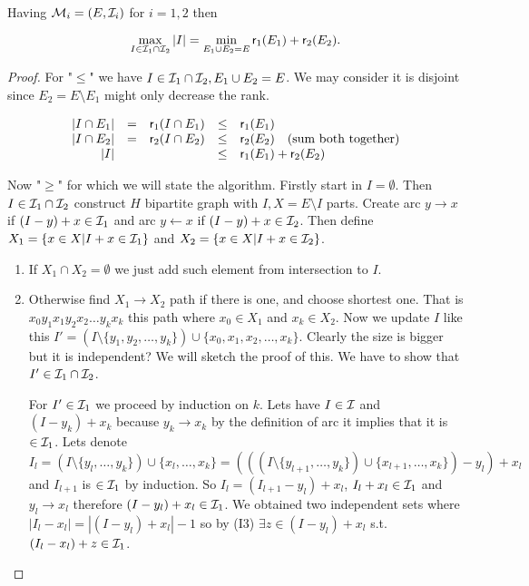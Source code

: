 \begin{thm}
	Having $\mathcal{M}_i = (E, \mathcal{I}_i)$ for $i = 1,2$ then
	
	$$
	\max_{I \in \mathcal{I}_1 \cap \mathcal{I}_2} |I| = \min_{E_1 \cup E_2 = E} \operatorname{\textsf{r}}_1(E_1) + \operatorname{\textsf{r}}_2(E_2).
	$$
	\label{min-max-thm}
\end{thm}

\begin{proof}
	For "$\leq$" we have $I \in \mathcal{I}_1 \cap \mathcal{I}_2, E_1 \cup E_2 = E$. We may consider it is disjoint since $E_2 = E \setminus E_1$ might only decrease the rank.
	
	$$
	\begin{array}{r c c c l}
		|I \cap E_1| & = & \operatorname{\textsf{r}}_1 (I \cap E_1) & \leq & \operatorname{\textsf{r}}_1(E_1) \\
		|I \cap E_2| & = & \operatorname{\textsf{r}}_2 (I \cap E_2) & \leq & \operatorname{\textsf{r}}_2(E_2) \quad \text{(sum both together)}\\
		|I| & & & \leq & \operatorname{\textsf{r}}_1(E_1) + \operatorname{\textsf{r}}_2(E_2) \\
	\end{array}
	$$
	
	Now "$\geq$" for which we will state the algorithm. Firstly start in $I = \emptyset$. Then $I \in \mathcal{I}_1 \cap \mathcal{I}_2$ construct $H$ bipartite graph with $I, X = E \setminus I$ parts. Create arc $y \to x$ if $(I - y) + x \in \mathcal{I}_1$ and arc $y \leftarrow x$ if $(I - y) + x \in \mathcal{I}_2$. Then define $X_1 = \{x \in X | I + x \in \mathcal{I}_1\}$ and $X_2 = \{x \in X | I + x \in \mathcal{I}_2\}$.
	
	\begin{enumerate}
		\item If $X_1 \cap X_2 = \emptyset$ we just add such element from intersection to $I$.
		\item Otherwise find $X_1 \to X_2$ path if there is one, and choose shortest one. That is $x_0 y_1 x_1 y_2 x_2 \dots y_k x_k$ this path where $x_0 \in X_1$ and $x_k \in X_2$. Now we update $I$ like this $I' = (I \setminus \{y_1, y_2, \dots, y_k\}) \cup \{x_0, x_1, x_2, \dots, x_k\}$. Clearly the size is bigger but it is independent? We will sketch the proof of this. We have to show that $I' \in \mathcal{I}_1 \cap \mathcal{I}_2$.
		
		For $I' \in \mathcal{I}_1$ we proceed by induction on $k$. Lets have $I \in \mathcal{I}$ and $(I - y_k) + x_k$ because $y_k \to x_k$ by the definition of arc it implies that it is $\in \mathcal{I}_1$. Lets denote $I_l = (I \setminus \{y_l, \dots, y_k\}) \cup \{x_l, \dots, x_k\} = (((I \setminus \{y_{l+1}, \dots, y_k\}) \cup \{x_{l+1}, \dots, x_k\}) - y_l) + x_l$ and $I_{l+1}$ is $\in \mathcal{I}_1$ by induction. So $I_l = (I_{l+1} - y_l) + x_l$, $I_l + x_l \in \mathcal{I}_1$ and $y_l \to x_l$ therefore $(I - y_l) + x_l \in \mathcal{I}_1$. We obtained two independent sets where $|I_l - x_l| = |(I - y_l) + x_l| - 1$ so by (I3) $\exists z \in (I - y_l) + x_l$ s.t. $(I_l - x_l) + z \in \mathcal{I}_1$.
		

\end{enumerate}
\end{proof}
